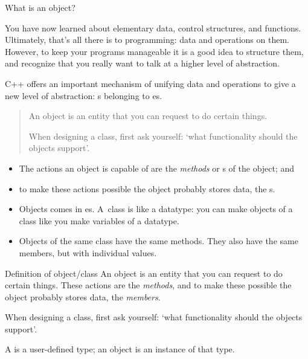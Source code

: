 
 {What is an object?}
\label{sec:object}

You have now learned about elementary data,
control structures,
and functions.
Ultimately, that's all there is to programming:
data and operations on them.
However, to keep your programs manageable
it is a good idea to structure them,
and recognize that you really want to talk at a higher level of abstraction.

C++ offers an important mechanism of unifying data and operations
to give a new level of abstraction:
s belonging to es.

\begin{mdframed}
  \begin{quotation}
    \noindent
    An object is an entity that you can request to do certain things.

    \noindent
    When designing a class, first ask yourself: `what functionality
    should the objects support'.
  \end{quotation}
\end{mdframed}

\begin{itemize}
\item
  The actions an object is capable of are the
  \emph{methods}
  or s of the object; and
\item to make these actions possible the object probably stores
  data, the
  s.
\item
  Objects comes in es. A~class is like a datatype:
  you can make objects of a class like you make variables of a datatype.
\item
  Objects of the same class have the same methods.
  They also have the same members, but with individual values.
\end{itemize}

\begin{slide}{Definition of object/class}
  \label{sl:object-def}
  An object is an entity that you can request to do certain
  things. These actions are the
  \emph{methods},
  and to make these possible the object probably stores
  data, the
  \emph{members}.

  When designing a class, first ask yourself:\slidebreak
  `what functionality should the objects support'.

  A  is a user-defined type;
  an object is an instance of that type.
\end{slide}

